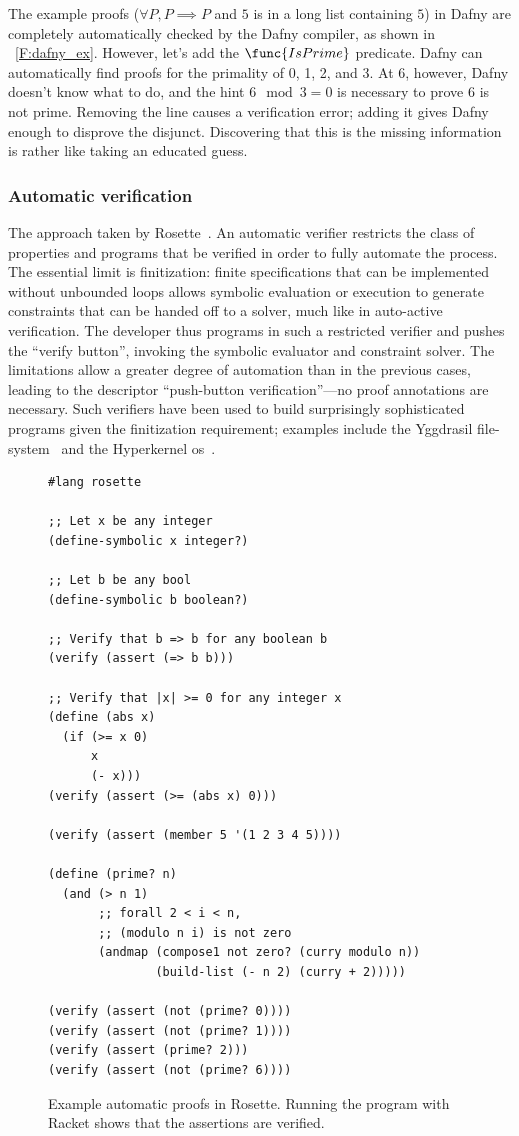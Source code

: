 The example proofs (\(\forall P, P \implies P\) and \(5\) is in a long list
containing \(5\)) in Dafny are completely automatically checked by the Dafny
compiler, as shown in \figurename~\ref{F:dafny_ex}. However, let's add the
\(\func{IsPrime}\) predicate. Dafny can automatically find proofs for the
primality of 0, 1, 2, and 3. At 6, however, Dafny doesn't know what to do, and
the hint \(6 \mod 3 = 0\) is necessary to prove 6 is not prime. Removing the
line causes a verification error; adding it gives Dafny enough to disprove the
disjunct. Discovering that this is the missing information is rather like taking
an educated guess.

\subsubsection{Automatic verification}

The approach taken by Rosette~\cite{Torlak_2013}. An automatic verifier
restricts the class of properties and programs that be verified in order to
fully automate the process. The essential limit is finitization: finite
specifications that can be implemented without unbounded loops allows symbolic
evaluation or execution to generate constraints that can be handed off to a
solver, much like in auto-active verification. The developer thus programs in
such a restricted verifier and pushes the ``verify button'', invoking the symbolic
evaluator and constraint solver. The limitations allow a greater degree of
automation than in the previous cases, leading to the descriptor ``push-button
verification''---no proof annotations are necessary. Such verifiers have been used
to build surprisingly sophisticated programs given the finitization requirement;
examples include the Yggdrasil file-system~\cite{Sigurbjarnarson_2016} and the
Hyperkernel \gls{os}~\cite{Nelson_2017}.

\begin{figure}[ht]
\begin{verbatim}
#lang rosette

;; Let x be any integer
(define-symbolic x integer?)

;; Let b be any bool
(define-symbolic b boolean?)

;; Verify that b => b for any boolean b
(verify (assert (=> b b)))

;; Verify that |x| >= 0 for any integer x
(define (abs x)
  (if (>= x 0)
      x
      (- x)))
(verify (assert (>= (abs x) 0)))

(verify (assert (member 5 '(1 2 3 4 5))))

(define (prime? n)
  (and (> n 1)
       ;; forall 2 < i < n,
       ;; (modulo n i) is not zero
       (andmap (compose1 not zero? (curry modulo n))
               (build-list (- n 2) (curry + 2)))))

(verify (assert (not (prime? 0))))
(verify (assert (not (prime? 1))))
(verify (assert (prime? 2)))
(verify (assert (not (prime? 6))))
\end{verbatim}
    \caption{Example automatic proofs in Rosette. Running the program with
    Racket shows that the assertions are verified.}\label{F:rosette}
\end{figure}

